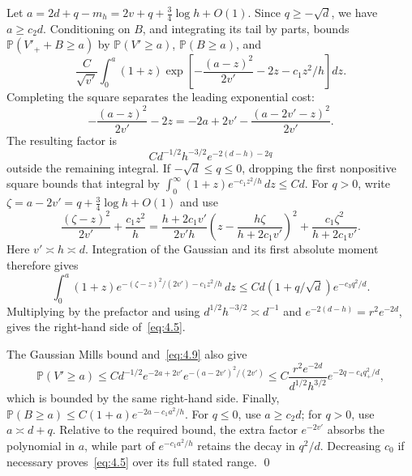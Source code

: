 \documentclass[11pt,a4paper]{article}
\numberwithin{equation}{section}
\theoremstyle{remark}
\begin{document}
Let $a=2d+q-m_h=2v+q+\tfrac34\log h+O(1)$. Since $q\ge-\sqrt d$, we have $a\ge c_2d$. Conditioning on $B$, and integrating its tail by parts, bounds
$\mathbb P(V'_++B\ge a)$ by $\mathbb P(V'\ge a)$, $\mathbb P(B\ge a)$, and
\begin{equation}\label{eq:4.8}
\frac C{\sqrt{v'}}\int_0^a(1+z)
\exp\left[-\frac{(a-z)^2}{2v'}-2z-c_1z^2/h\right]dz.
\end{equation}
Completing the square separates the leading exponential cost:
\begin{equation}\label{eq:4.9}
-\frac{(a-z)^2}{2v'}-2z
=-2a+2v'-\frac{(a-2v'-z)^2}{2v'}.
\end{equation}
The resulting factor is
\[
C d^{-1/2}h^{-3/2}e^{-2(d-h)-2q}
\]
outside the remaining integral. If $-\sqrt d\le q\le0$, dropping the first nonpositive square bounds that integral by
$\int_0^\infty(1+z)e^{-c_1z^2/h}\,dz\le Cd$.
For $q>0$, write $\zeta=a-2v'=q+\tfrac34\log h+O(1)$ and use
\begin{equation}\label{eq:terminal-double-square}
\frac{(\zeta-z)^2}{2v'}+\frac{c_1z^2}{h}
=\frac{h+2c_1v'}{2v'h}
 \left(z-\frac{h\zeta}{h+2c_1v'}\right)^2
 +\frac{c_1\zeta^2}{h+2c_1v'}.
\end{equation}
Here $v'\asymp h\asymp d$. Integration of the Gaussian and its first absolute moment therefore gives
\[
\int_0^a(1+z)
 e^{-(\zeta-z)^2/(2v')-c_1z^2/h}\,dz
\le Cd(1+q/\sqrt d)e^{-c_3q^2/d}.
\]
Multiplying by the prefactor and using
$d^{1/2}h^{-3/2}\asymp d^{-1}$ and
$e^{-2(d-h)}=r^2e^{-2d}$, gives the right-hand side of~\eqref{eq:4.5}.

The Gaussian Mills bound and~\eqref{eq:4.9} also give
\[
\mathbb P(V'\ge a)
\le C d^{-1/2}e^{-2a+2v'}
 e^{-(a-2v')^2/(2v')}
\le C\frac{r^2e^{-2d}}{d^{1/2}h^{3/2}}
 e^{-2q-c_4q_+^2/d},
\]
which is bounded by the same right-hand side. Finally,
$\mathbb P(B\ge a)\le C(1+a)e^{-2a-c_1a^2/h}$.
For $q\le0$, use $a\ge c_2d$; for $q>0$, use $a\asymp d+q$. Relative to the required bound, the extra factor $e^{-2v'}$ absorbs the polynomial in $a$, while part of $e^{-c_1a^2/h}$ retains the decay in $q^2/d$. Decreasing $c_0$ if necessary proves~\eqref{eq:4.5} over its full stated range.
\qed
\end{document}
